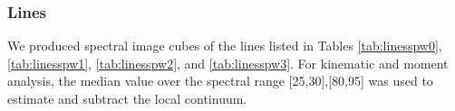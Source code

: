 \documentclass{emulateapj}
\begin{document}
\subsubsection{Lines}
\label{sec:obslines}
We produced spectral image cubes of the lines listed in Tables
\ref{tab:linesspw0}, \ref{tab:linesspw1}, \ref{tab:linesspw2}, and
\ref{tab:linesspw3}.  For kinematic and moment analysis, the median value over
the spectral range [25,30],[80,95] \kms was used to estimate and subtract the
local continuum. 





% 
\end{document}
